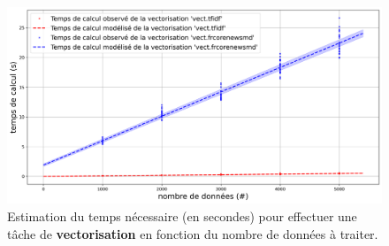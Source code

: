 			\begin{figure}[!htb]
				\centering
				\includegraphics[width=\textwidth]{figures/etude-temps-calcul-modelisation-2vect}
				\caption{Estimation du temps nécessaire (en secondes) pour effectuer une tâche de \textbf{vectorisation} en fonction du nombre de données à traiter.}
				\label{figure:4.3.1-ETUDE-COUTS-TEMPS-CALCUL-MODELISATION-VECTORIZATION}
			\end{figure}
			
			
